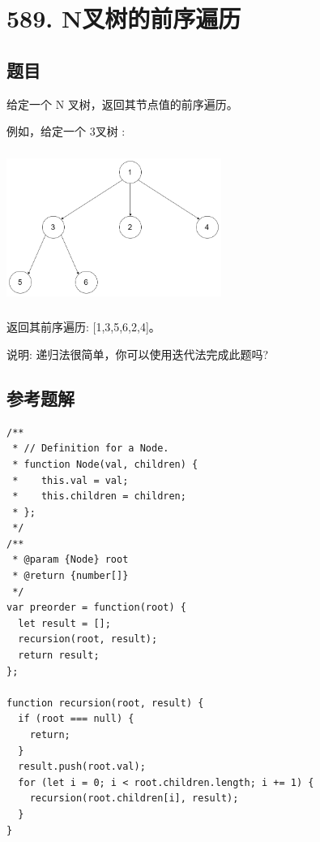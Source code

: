 \newpage
\section{589. N叉树的前序遍历}
\label{leetcode:589}

\subsection{题目}

给定一个 N 叉树，返回其节点值的前序遍历。

例如，给定一个 3叉树 :

\includegraphics[width=70mm,height=50mm]{images/leetcode/leetcode_429_narytreeexample.png}

返回其前序遍历: [1,3,5,6,2,4]。

说明: 递归法很简单，你可以使用迭代法完成此题吗?

\subsection{参考题解}

\begin{verbatim}
/**
 * // Definition for a Node.
 * function Node(val, children) {
 *    this.val = val;
 *    this.children = children;
 * };
 */
/**
 * @param {Node} root
 * @return {number[]}
 */
var preorder = function(root) {
  let result = [];
  recursion(root, result);
  return result;
};

function recursion(root, result) {
  if (root === null) {
    return;
  }
  result.push(root.val);
  for (let i = 0; i < root.children.length; i += 1) {
    recursion(root.children[i], result);
  }
}
\end{verbatim}
